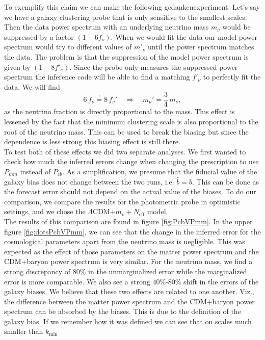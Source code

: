 \documentclass[../main.tex]{subfiles}
\begin{document}
To exemplify this claim we can make the following gedankenexperiment. Let's say we have a galaxy clustering probe that is only sensitive to the smallest scales. Then the data power spectrum with an underlying neutrino mass $m_\nu$ would be suppressed by a factor $(1-6f_\nu)$. When we would fit the data our model power spectrum would try to different values of $m'_\nu$ until the power spectrum matches the data. The problem is that the suppression of the model power spectrum is given by $(1-8f'_\nu)$. Since the probe only measures the suppressed power spectrum the inference code will be able to find a matching $f'_\nu$ to perfectly fit the data. We will find \begin{equation}
    6\,f_\nu \overset{!}{=} 8\,f_\nu' \quad\Longrightarrow\quad m_\nu' = \frac{3}{4}\, m_\nu,
\end{equation}
as the neutrino fraction is directly proportional to the mass. This effect is lessened by the fact that the minimum clustering scale is also proportional to the root of the neutrino mass. This can be used to break the biasing but since the dependence is less strong this biasing effect is still there.\\
To test both of these effects we did two separate analyses. We first wanted to check how much the inferred errors change when changing the prescription to use $P_{mm}$ instead of $P_{cb}$. As a simplification, we presume that the fiducial value of the galaxy bias does not change between the two runs, i.e. $\hat{b}=b$. This can be done as the forecast error should not depend on the actual value of the biases. To do our comparison, we compare the results for the photometric probe in optimistic settings, and we chose the $\Lambda$CDM+$m_\nu+N_\mathrm{eff}$ model.\\  
The results of this comparison are found in figure \ref{fig:PcbVPmm}. In the upper figure \ref{fig:dotsPcbVPmm}, we can see that the change in the inferred error for the cosmological parameters apart from the neutrino mass is negligible. This was expected as the effect of those parameters on the matter power spectrum and the CDM+baryon power spectrum is very similar. For the neutrino mass, we find a strong discrepancy of 80\% in the unmarginalized error while the marginalized error is more comparable. We also see a strong 40\%-80\% shift in the errors of the galaxy biases. We believe that these two effects are related to one another. Viz., the difference between the matter power spectrum and the CDM+baryon power spectrum can be absorbed by the biases. This is due to the definition of the galaxy bias. If we remember how it was defined we can see that on scales much smaller than $k_\mathrm{min}$
\end{document}
